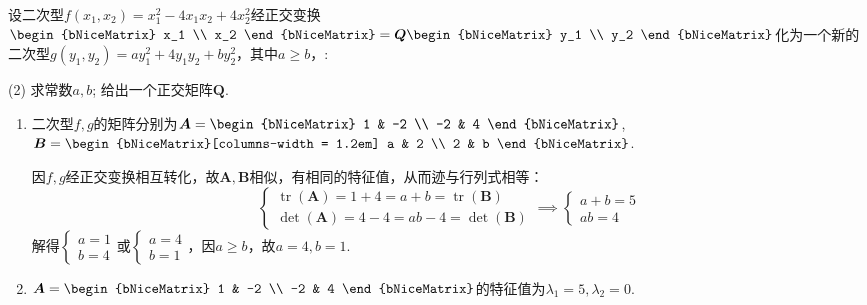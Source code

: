 \documentclass[12pt, a4paper, oneside, UTF8]{ctexbook}
\begin{document}
\begin{example}
    设二次型$f(x_1, x_2) = x_1^2 - 4x_1 x_2 + 4x_2^2$经正交变换$\begin{bNiceMatrix} x_1 \\ x_2 \end{bNiceMatrix} = \bm{Q} \begin{bNiceMatrix} y_1 \\ y_2 \end{bNiceMatrix}$化为一个新的二次型$g(y_1, y_2) = ay_1^2+4y_1y_2+by_2^2$，其中$a \ge b$，:\begin{tasks}[label=(\arabic*)](2)
        \task 求常数$a, b$;
        \task 给出一个正交矩阵$\bm{Q}$.
    \end{tasks}
\end{example}
\begin{solution}
    \begin{enumerate}
        \item 二次型$f, g$的矩阵分别为$\bm{A} = \begin{bNiceMatrix} 1 & -2 \\ -2 & 4 \end{bNiceMatrix}$, $\bm{B} = \begin{bNiceMatrix}[columns-width = 1.2em] a & 2 \\ 2 & b \end{bNiceMatrix}$.

        因$f, g$经正交变换相互转化，故$\bm{A}, \bm{B}$相似，有相同的特征值，从而迹与行列式相等：
        \[ \begin{cases} \operatorname{tr}(\bm{A}) = 1+4 = a+b = \operatorname{tr}(\bm{B}) \\ \det(\bm{A}) = 4-4 = ab-4 = \det(\bm{B}) \end{cases} \implies \begin{cases} a+b=5 \\ ab=4 \end{cases} \]
        解得$\begin{cases} a=1 \\ b=4 \end{cases}$或$\begin{cases} a=4 \\ b=1 \end{cases}$，因$a \ge b$，故$a=4, b=1$.
        \item  $\bm{A} = \begin{bNiceMatrix} 1 & -2 \\ -2 & 4 \end{bNiceMatrix}$的特征值为$\lambda_1=5, \lambda_2=0$.


\end{enumerate}
\end{solution}
\end{document}
